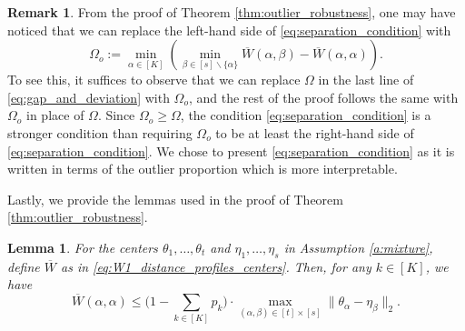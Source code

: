 \documentclass[11pt,letterpaper]{article}
\newtheorem{lemma}{Lemma} %
\theoremstyle{definition}
\newtheorem{remark}{Remark}
\numberwithin{equation}{section}
\begin{document}
\begin{remark}
    From the proof of Theorem \ref{thm:outlier_robustness}, one may have noticed that we can replace the left-hand side of \eqref{eq:separation_condition} with 
    \begin{equation*}
        \Omega_o := \min_{\alpha \in [K]} \left(\min_{\beta \in [s] \backslash \{\alpha\}} \overline{W}(\alpha, \beta) - \overline{W}(\alpha, \alpha)\right).
    \end{equation*}
    To see this, it suffices to observe that we can replace $\Omega$ in the last line of \eqref{eq:gap_and_deviation} with $\Omega_o$, and the rest of the proof follows the same with $\Omega_o$ in place of $\Omega$. Since $\Omega_o \ge \Omega$, the condition \eqref{eq:separation_condition} is a stronger condition than requiring $\Omega_o$ to be at least the right-hand side of \eqref{eq:separation_condition}. We chose to present \eqref{eq:separation_condition} as it is written in terms of the outlier proportion which is more interpretable. 
\end{remark}

Lastly, we provide the lemmas used in the proof of Theorem \ref{thm:outlier_robustness}.
\begin{lemma}
    \label{lem:Wasserstein_separation}
    For the centers $\theta_1, \ldots, \theta_t$ and $\eta_1, \ldots, \eta_s$ in Assumption \ref{a:mixture}, define $\overline{W}$ as in \eqref{eq:W1_distance_profiles_centers}. Then, for any $k \in [K]$, we have
    \begin{equation}
        \label{eq:matching_center_upper_bound}
        \overline{W}(\alpha, \alpha) \le \bigg(1 - \sum_{k \in [K]} p_k\bigg) \cdot \max_{(\alpha, \beta) \in [t] \times [s]} \|\theta_\alpha - \eta_\beta\|_2.
    \end{equation}
\end{lemma}
\end{document}
